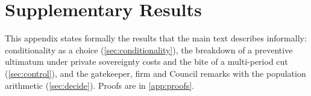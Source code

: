 \section{Supplementary Results}\label{app:supp}

This appendix states formally the results that the main text describes informally: conditionality as a choice (\cref{sec:conditionality}), the breakdown of a preventive ultimatum under private sovereignty costs and the bite of a multi-period cut (\cref{sec:control}), and the gatekeeper, firm and Council remarks with the population arithmetic (\cref{sec:decide}). Proofs are in \cref{app:proofs}.




